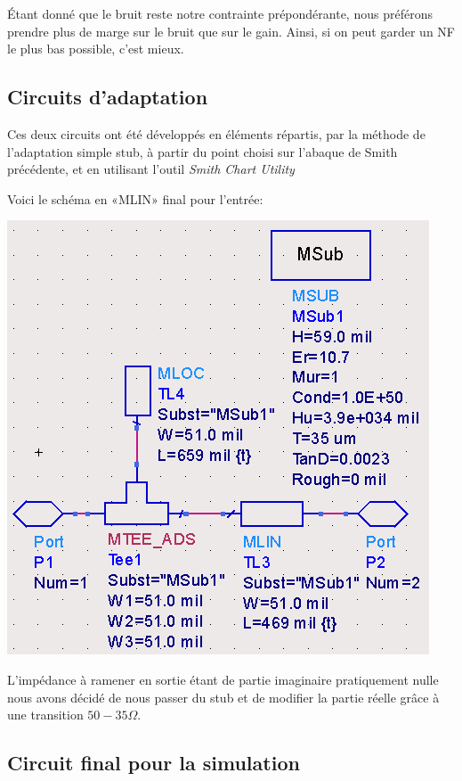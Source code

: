 \documentclass[12pt]{article}
\begin{document}
Étant donné que le bruit reste notre contrainte prépondérante, nous préférons prendre plus de marge sur le bruit que sur le gain. Ainsi, si on peut garder un NF le plus bas possible, c’est mieux.

\subsection{Circuits d’adaptation}

Ces deux circuits ont été développés en éléments répartis, par la méthode de l'adaptation simple stub, à partir du point choisi sur l’abaque de Smith précédente, et en utilisant l’outil \textit{Smith Chart Utility}

Voici le schéma en «MLIN» final pour l’entrée:

\begin{center}
\includegraphics[width=\linewidth]{img/reseau_adapt_entree}
\end{center}

L'impédance à ramener en sortie étant de partie imaginaire pratiquement nulle nous avons décidé de nous passer du stub et de modifier la partie réelle grâce à une transition $50-35 \Omega$.

\newpage

\subsection{Circuit final pour la simulation}
\end{document}

